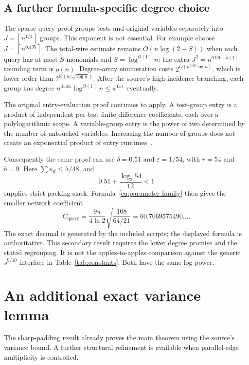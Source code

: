 \documentclass[11pt,letterpaper]{article}
\theoremstyle{definition}\newtheorem{definition}[theorem]{Definition}
\theoremstyle{remark}\newtheorem{remark}[theorem]{Remark}
\newcommand{\ceil}[1]{\left\lceil#1\right\rceil}
\begin{document}
\subsection{A further formula-specific degree choice}
The sparse-query proof groups tests and original variables separately
into $J=\ceil{n^{1/4}}$ groups. This exponent is not essential.
For example choose $J=\ceil{n^{0.495}}$. The total-wire estimate
remains $O(n\log(2+S))$ when each query has at most $S$
monomials and $S=\log^{O(1)}n$: the extra $J^2=n^{0.99+o(1)}$
rounding term is $o(n)$. Degree-array enumeration costs
$2^{O(n^{0.99}\log n)}$, which is lower order than
$2^{\Theta(n/\sqrt{\log n})}$. After the source's high-incidence
branching, each group has degree
$n^{0.505}\log^{O(1)}n\le s^{0.51}$ eventually.

The original entry-evaluation proof continues to apply. A test-group
entry is a product of independent per-test finite-difference
coefficients, each over a polylogarithmic scope. A variable-group
entry is the power of two determined by the number of untouched
variables. Increasing the number of groups does not create an
exponential product of entry runtimes~\cite{reduction}.

Consequently the same proof can use $\delta=0.51$ and
$\varepsilon=1/54$, with $r=54$ and $b=9$. Here
$\sum u_d\le\lambda/48$, and
\[
 0.51+\frac{\log_2 54}{12}<1
\]
supplies strict packing slack. Formula~\eqref{eq:parameter-family}
then gives the smaller network coefficient
\begin{equation}\label{eq:formula-specific}
 C_{\mathrm{query}}
 =\frac{9\pi}{4\ln2}\sqrt{\frac{108}{64/21}}
 =60.7069575490\ldots.
\end{equation}
The exact decimal is generated by the included scripts; the displayed
formula is authoritative. This secondary result requires the lower
degree promise and the stated regrouping. It is not the apples-to-apples
comparison against the generic $s^{9/10}$ interface in
Table~\ref{tab:constants}. Both have the same log-power.

\section{An additional exact variance lemma}\label{sec:variance}
The sharp-padding result already proves the main theorem using the
source's variance bound. A further structural refinement is available
when parallel-edge multiplicity is controlled.
\end{document}
